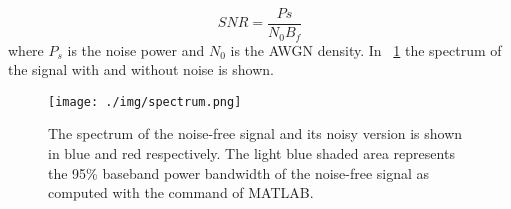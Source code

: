 \begin{equation}
SNR = \dfrac{Ps}{N_0 B_f}
\end{equation}
where $P_s$ is the noise power and $N_0$ is the \ac{AWGN} density.
In \figurename~\ref{fig:spectrum_nft} the spectrum of the signal with and without noise is shown.

\begin{figure}[!h]
  \centering
  \texttt{[image: ./img/spectrum.png]}
  \caption{The spectrum of the noise-free signal and its noisy version is shown in blue and red respectively. The light blue shaded area represents the 95\% baseband power bandwidth of the noise-free signal as computed with the  command of MATLAB.}
  \label{fig:spectrum_nft}
\end{figure}

%

